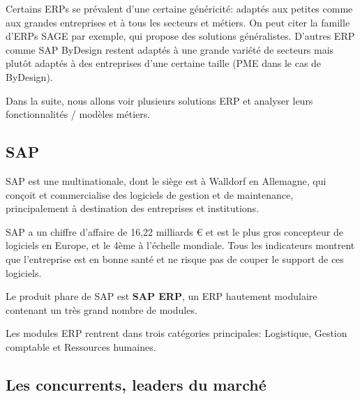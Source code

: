     	Certains ERPs se prévalent d'une certaine généricité: adaptés aux petites comme aux grandes entreprises et à tous les secteurs et métiers. On peut citer la famille d'ERPs SAGE par exemple, qui propose des solutions généralistes. D'autres ERP comme SAP ByDesign restent adaptés à une grande variété de secteurs mais plutôt adaptés à des entreprises d'une certaine taille (PME dans le cas de ByDesign).

    	Dans la suite, nous allons voir plusieurs solutions ERP et analyser leurs fonctionnalités / modèles métiers.

	    \subsection{SAP}

	    SAP est une multinationale, dont le siège est à Walldorf en Allemagne, qui conçoit et commercialise des logiciels de gestion et de maintenance, principalement à destination des entreprises et institutions.

	    SAP a un chiffre d'affaire de 16,22 milliards € et est le plus gros concepteur de logiciels en Europe, et le 4ème à l'échelle mondiale. Tous les indicateurs montrent que l'entreprise est en bonne santé et ne risque pas de couper le support de ces logiciels.

	    Le produit phare de SAP est \textbf{SAP ERP}, un ERP hautement modulaire contenant un très grand nombre de modules.

	    Les modules ERP rentrent dans trois catégories principales: Logistique, Gestion comptable et Ressources humaines.



\subsection{Les concurrents, leaders du marché}
